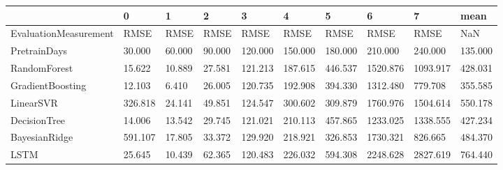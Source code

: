 \begin{tabular}{llllllllll}
\toprule
{} &       0 &      1 &      2 &       3 &       4 &       5 &        6 &        7 &    mean \\
\midrule
EvaluationMeasurement &    RMSE &   RMSE &   RMSE &    RMSE &    RMSE &    RMSE &     RMSE &     RMSE &     NaN \\
PretrainDays          &  30.000 & 60.000 & 90.000 & 120.000 & 150.000 & 180.000 &  210.000 &  240.000 & 135.000 \\
RandomForest          &  15.622 & 10.889 & 27.581 & 121.213 & 187.615 & 446.537 & 1520.876 & 1093.917 & 428.031 \\
GradientBoosting      &  12.103 &  6.410 & 26.005 & 120.735 & 192.908 & 394.330 & 1312.480 &  779.708 & 355.585 \\
LinearSVR             & 326.818 & 24.141 & 49.851 & 124.547 & 300.602 & 309.879 & 1760.976 & 1504.614 & 550.178 \\
DecisionTree          &  14.006 & 13.542 & 29.745 & 121.021 & 210.113 & 457.865 & 1233.025 & 1338.555 & 427.234 \\
BayesianRidge         & 591.107 & 17.805 & 33.372 & 129.920 & 218.921 & 326.853 & 1730.321 &  826.665 & 484.370 \\
LSTM                  &  25.645 & 10.439 & 62.365 & 120.483 & 226.032 & 594.308 & 2248.628 & 2827.619 & 764.440 \\
\bottomrule
\end{tabular}
